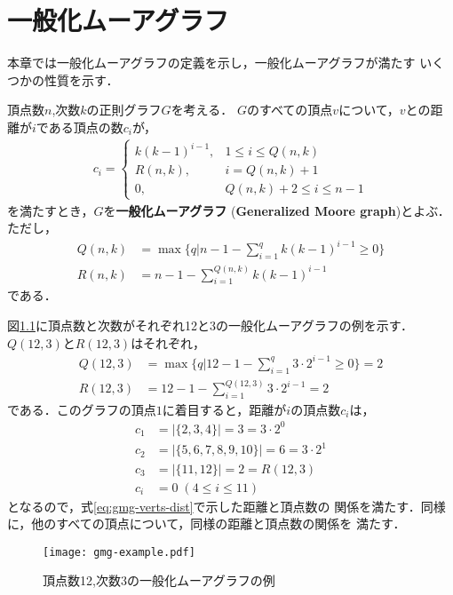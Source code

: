 
\chapter{一般化ムーアグラフ}
\label{chap:generalized-moore-graph}
本章では一般化ムーアグラフの定義を示し，一般化ムーアグラフが満たす
いくつかの性質を示す．
\begin{definition}\rm
  \label{def:generalized-moore-graph}
  頂点数$n$,次数$k$の正則グラフ$G$を考える．
  $G$のすべての頂点$v$について，$v$との距離が$i$である頂点の数$c_i$が，
  \begin{equation}
    \label{eq:gmg-verts-dist}
    \begin{aligned}
      c_i =
      \begin{cases}
        k(k-1)^{i-1}, & 1\leq i\leq Q(n,k) \\
        R(n,k), & i = Q(n,k)+1 \\
        0, & Q(n,k)+2\leq i \leq n-1
      \end{cases}
    \end{aligned}
  \end{equation}
  を満たすとき，$G$を\textbf{一般化ムーアグラフ}
  (\textbf{Generalized Moore graph})とよぶ．ただし，
  \begin{align}
    Q(n,k)&=\max\{q|n-1-\sum_{i=1}^{q}k(k-1)^{i-1}\geq 0\}\label{eq:gmg-q} \\
    R(n,k)&=n-1-\sum_{i=1}^{Q(n,k)}k(k-1)^{i-1}\label{eq:gmg-r}
  \end{align}
  である．
\end{definition}
\begin{example}\rm
  図\ref{fig:gmg-example}に頂点数と次数がそれぞれ12と3の一般化ムーアグラフの例を示す．
  $Q(12,3)$と$R(12,3)$はそれぞれ，
  \begin{align*}
    Q(12,3) &= \max\{q | 12-1-\sum_{i=1}^{q}3\cdot2^{i-1} \geq 0\} = 2 \\
    R(12,3) &= 12 - 1 - \sum_{i=1}^{Q(12,3)}3\cdot2^{i-1} = 2
  \end{align*}
  である．このグラフの頂点$1$に着目すると，距離が$i$の頂点数$c_i$は，
  \begin{align*}
    c_1&= |\{2,3,4\}| = 3 = 3\cdot2^0 \\
    c_2&= |\{5,6,7,8,9,10\}| = 6 = 3\cdot2^1 \\
    c_3&= |\{11,12\}| = 2 = R(12,3) \\
    c_i&= 0\;(4\leq i\leq11)
  \end{align*}
  となるので，式\eqref{eq:gmg-verts-dist}で示した距離と頂点数の
  関係を満たす．同様に，他のすべての頂点について，同様の距離と頂点数の関係を
  満たす．
  \begin{figure}
    \centering
    \texttt{[image: gmg-example.pdf]}
    \caption{頂点数12,次数3の一般化ムーアグラフの例}
    \label{fig:gmg-example}
  \end{figure}
\end{example}

